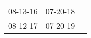 \begin{supertabular}{lll}
 08-13-16\textsuperscript{} &  07-20-18\textsuperscript{} \\
 08-12-17\textsuperscript{} &  07-20-19\textsuperscript{} \\
\end{supertabular}
